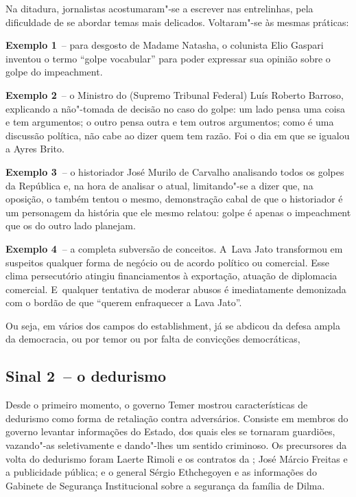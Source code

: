 Na ditadura, jornalistas acostumaram"-se a escrever nas entrelinhas, pela
dificuldade de se abordar temas mais delicados. Voltaram"-se às mesmas
práticas:

\textbf{Exemplo 1}~-- para desgosto de Madame Natasha, o colunista Elio
Gaspari inventou o termo ``golpe vocabular'' para poder expressar sua
opinião sobre o golpe do impeachment.

\textbf{Exemplo 2}~-- o Ministro do  (Supremo Tribunal Federal) Luís
Roberto Barroso, explicando a não"-tomada de decisão no caso do golpe: um
lado pensa uma coisa e tem argumentos; o outro pensa outra e tem outros
argumentos; como é uma discussão política, não cabe ao  dizer quem
tem razão. Foi o dia em que se igualou a Ayres Brito.

\textbf{Exemplo 3~}-- o historiador José Murilo de Carvalho analisando
todos os golpes da República e, na hora de analisar o atual,
limitando"-se a dizer que, na oposição, o  também tentou o mesmo,
demonstração cabal de que o historiador é um personagem da história que
ele mesmo relatou: golpe é apenas o impeachment que os do outro lado
planejam.

\textbf{Exemplo 4~}-- a completa subversão de conceitos. A~Lava Jato
transformou em suspeitos qualquer forma de negócio ou de acordo político
ou comercial. Esse clima persecutório atingiu financiamentos à
exportação, atuação de diplomacia comercial. E~qualquer tentativa de
moderar abusos é imediatamente demonizada com o bordão de que ``querem
enfraquecer a Lava Jato''.

Ou seja, em vários dos campos do establishment, já se abdicou da defesa
ampla da democracia, ou por temor ou por falta de convicções
democráticas,

\subsection{\textbf{Sinal 2~}-- o dedurismo}

Desde o primeiro momento, o governo Temer mostrou características de
dedurismo como forma de retaliação contra adversários. Consiste em
membros do governo levantar informações do Estado, dos quais eles se
tornaram guardiões, vazando"-as seletivamente e dando"-lhes um sentido
criminoso. Os precursores da volta do dedurismo foram Laerte Rimoli e os
contratos da ; José Márcio Freitas e a publicidade pública; e o
general Sérgio Ethchegoyen e as informações do Gabinete de Segurança
Institucional sobre a segurança da família de Dilma.


